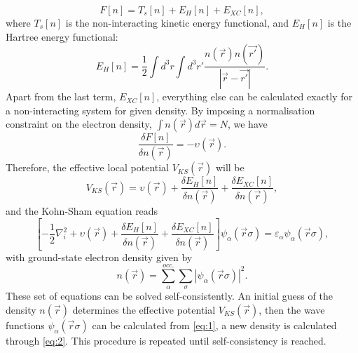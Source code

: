 \begin{equation}
F[n]=T_s[n]+E_H[n]+E_{XC}[n],
\end{equation}
where $T_s[n]$ is the non-interacting kinetic energy functional, and $E_H[n]$ is the Hartree energy functional:
\begin{equation}
E_H[n]=\frac{1}{2}\int d^3r\int d^3r'\frac{n(\vec{r})n(\vec{r'})}{|\vec{r}-\vec{r'}|}.
\end{equation}
Apart from the last term, $E_{XC}[n]$, everything else can be calculated exactly for a non-interacting system for given density. By imposing a normalisation constraint on the electron density, $\int n(\vec{r})d\vec{r}=N$, we have
\begin{equation}
\frac{\delta F[n]}{\delta n(\vec{r})}=-\upsilon(\vec{r}).
\end{equation}
Therefore, the effective local potential $V_{KS}(\vec{r})$ will be
\begin{equation}
V_{KS}(\vec{r})=\upsilon(\vec{r})+\frac{\delta E_H[n]}{\delta n(\vec{r})}+\frac{\delta E_{XC}[n]}{\delta n(\vec{r})},
\end{equation}
and the Kohn-Sham equation reads
\begin{equation}\label{eq:1}
\left[ -\frac{1}{2}\nabla_i^2+\upsilon(\vec{r})+\frac{\delta E_H[n]}{\delta n(\vec{r})}+\frac{\delta E_{XC}[n]}{\delta n(\vec{r})}\right]\mathit{\psi}_\alpha(\vec{r}\sigma)=\varepsilon_\alpha\mathit{\psi}_\alpha(\vec{r}\sigma),
\end{equation}
with ground-state electron density given by 
\begin{equation}\label{eq:2}
n(\vec{r})=\sum_\alpha^{occ.}\sum_\sigma|\mathit{\psi}_\alpha(\vec{r}\sigma)|^2.
\end{equation}
These set of equations can be solved self-consistently. An initial guess of the density $n(\vec{r})$ determines the effective potential $V_{KS}(\vec{r})$, then the wave functions $\mathit{\psi}_\alpha(\vec{r}\sigma)$ can be calculated from \autoref{eq:1}, a new density is calculated through \autoref{eq:2}. This procedure is repeated until self-consistency is reached. 
